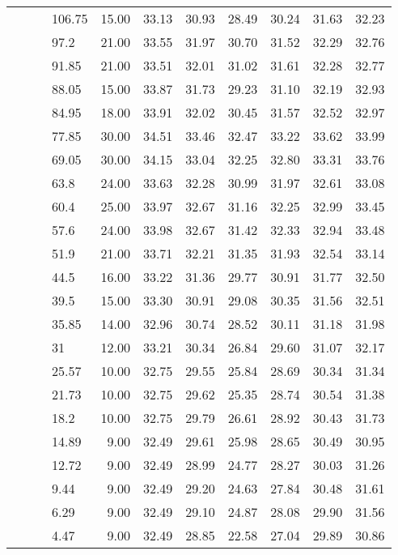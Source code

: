 \begin{longtable}{llllrrrrrrr}
   &  &  & 106.75 & 15.00 & 33.13 & 30.93 & 28.49 & 30.24 & 31.63 & 32.23 \\ 
   &  &  & 97.2 & 21.00 & 33.55 & 31.97 & 30.70 & 31.52 & 32.29 & 32.76 \\ 
   &  &  & 91.85 & 21.00 & 33.51 & 32.01 & 31.02 & 31.61 & 32.28 & 32.77 \\ 
   &  &  & 88.05 & 15.00 & 33.87 & 31.73 & 29.23 & 31.10 & 32.19 & 32.93 \\ 
   &  &  & 84.95 & 18.00 & 33.91 & 32.02 & 30.45 & 31.57 & 32.52 & 32.97 \\ 
   &  &  & 77.85 & 30.00 & 34.51 & 33.46 & 32.47 & 33.22 & 33.62 & 33.99 \\ 
   &  &  & 69.05 & 30.00 & 34.15 & 33.04 & 32.25 & 32.80 & 33.31 & 33.76 \\ 
   &  &  & 63.8 & 24.00 & 33.63 & 32.28 & 30.99 & 31.97 & 32.61 & 33.08 \\ 
   &  &  & 60.4 & 25.00 & 33.97 & 32.67 & 31.16 & 32.25 & 32.99 & 33.45 \\ 
   &  &  & 57.6 & 24.00 & 33.98 & 32.67 & 31.42 & 32.33 & 32.94 & 33.48 \\ 
   &  &  & 51.9 & 21.00 & 33.71 & 32.21 & 31.35 & 31.93 & 32.54 & 33.14 \\ 
   &  &  & 44.5 & 16.00 & 33.22 & 31.36 & 29.77 & 30.91 & 31.77 & 32.50 \\ 
   &  &  & 39.5 & 15.00 & 33.30 & 30.91 & 29.08 & 30.35 & 31.56 & 32.51 \\ 
   &  &  & 35.85 & 14.00 & 32.96 & 30.74 & 28.52 & 30.11 & 31.18 & 31.98 \\ 
   &  &  & 31 & 12.00 & 33.21 & 30.34 & 26.84 & 29.60 & 31.07 & 32.17 \\ 
   &  &  & 25.57 & 10.00 & 32.75 & 29.55 & 25.84 & 28.69 & 30.34 & 31.34 \\ 
   &  &  & 21.73 & 10.00 & 32.75 & 29.62 & 25.35 & 28.74 & 30.54 & 31.38 \\ 
   &  &  & 18.2 & 10.00 & 32.75 & 29.79 & 26.61 & 28.92 & 30.43 & 31.73 \\ 
   &  &  & 14.89 & 9.00 & 32.49 & 29.61 & 25.98 & 28.65 & 30.49 & 30.95 \\ 
   &  &  & 12.72 & 9.00 & 32.49 & 28.99 & 24.77 & 28.27 & 30.03 & 31.26 \\ 
   &  &  & 9.44 & 9.00 & 32.49 & 29.20 & 24.63 & 27.84 & 30.48 & 31.61 \\ 
   &  &  & 6.29 & 9.00 & 32.49 & 29.10 & 24.87 & 28.08 & 29.90 & 31.56 \\ 
   &  &  & 4.47 & 9.00 & 32.49 & 28.85 & 22.58 & 27.04 & 29.89 & 30.86 \\ 

\end{longtable}
